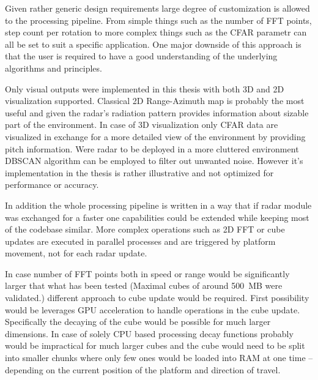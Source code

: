 Given rather generic design requirements  large degree of customization is allowed to the processing pipeline.
From simple things such as the number of FFT points, step count per rotation to more complex things such as the CFAR parametr can all be set to suit a specific application.
One major downside of this approach is that the user is required to have a good understanding of the underlying algorithms and principles.

Only visual outputs were implemented in this thesis with both 3D and 2D visualization supported.
Classical 2D Range-Azimuth map is probably the most useful and given the radar's radiation pattern provides information about sizable part of the environment.
In case of 3D visualization only CFAR data are visualized in exchange for a more detailed view of the environment by providing pitch information.
Were radar to be deployed in a more cluttered environment DBSCAN algorithm can be employed to filter out unwanted noise.
However it's implementation in the thesis is rather illustrative and not optimized for performance or accuracy.


In addition the whole processing pipeline is written in a way that if radar module was exchanged for a faster one capabilities could be extended while keeping most of the codebase similar.
More complex operations such as 2D FFT or cube updates are executed in parallel processes and are triggered by platform movement, not for each radar update.

In case number of FFT points both in speed or range would be significantly larger that what has been tested (Maximal cubes of around 500~MB were validated.) different approach to cube update would be required.
First possibility would be leverages GPU acceleration to handle operations in the cube update.
Specifically the decaying of the cube would be possible for much larger dimensions.
In case of solely CPU based processing decay functions probably would be impractical for much larger cubes and the cube would need to be split into smaller chunks where only few ones would be loaded into RAM at one time -- depending on the current position of the platform and direction of travel.



